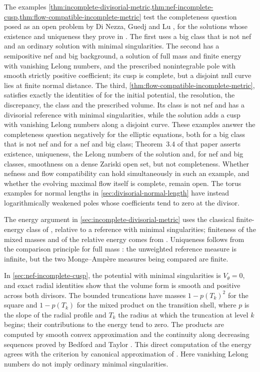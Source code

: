 The examples \cref{thm:incomplete-divisorial-metric,thm:nef-incomplete-cusp,thm:flow-compatible-incomplete-metric} test the completeness question posed as an open problem by Di Nezza, Guedj and Lu \cite[v1, Question~3.5, p.~14]{DNGL26}, for the solutions whose existence and uniqueness they prove in \cite[v1, Theorem~3.4, p.~14]{DNGL26}. The first uses a big class that is not nef and an ordinary solution with minimal singularities. The second has a semipositive nef and big background, a solution of full mass and finite energy with vanishing Lelong numbers, and the prescribed nonintegrable pole with smooth strictly positive coefficient; its cusp is complete, but a disjoint null curve lies at finite normal distance. The third, \cref{thm:flow-compatible-incomplete-metric}, satisfies exactly the identities of \cite[v1, Section~3.1, pp.~12--14]{DNGL26} for the initial potential, the resolution, the discrepancy, the class and the prescribed volume. Its class is not nef and has a divisorial reference with minimal singularities, while the solution adds a cusp with vanishing Lelong numbers along a disjoint curve. These examples answer the completeness question negatively for the elliptic equations, both for a big class that is not nef and for a nef and big class; Theorem~3.4 of that paper asserts existence, uniqueness, the Lelong numbers of the solution and, for nef and big classes, smoothness on a dense Zariski open set, but not completeness. Whether nefness and flow compatibility can hold simultaneously in such an example, and whether the evolving maximal flow itself is complete, remain open. The torus examples for normal lengths in \cref{sec:divisorial-normal-length} have instead logarithmically weakened poles whose coefficients tend to zero at the divisor.

The energy argument in \cref{sec:incomplete-divisorial-metric} uses the classical finite-energy class of \cite[Section~2, pp.~223--236]{BEGZ10}, relative to a reference with minimal singularities; finiteness of the mixed masses and of the relative energy comes from \cite[Proposition~1.6, p.~206, and Section~2.2, pp.~226--230]{BEGZ10}. Uniqueness follows from the comparison principle for full mass \cite[Corollary~2.3, p.~224]{BEGZ10}: the unweighted reference measure is infinite, but the two Monge--Amp\`ere measures being compared are finite.

In \cref{sec:nef-incomplete-cusp}, the potential with minimal singularities is $V_\theta=0$, and exact radial identities show that the volume form is smooth and positive across both divisors. The bounded truncations have masses $1-p(T_k)^2$ for the square and $1-p(T_k)$ for the mixed product on the transition shell, where $p$ is the slope of the radial profile and $T_k$ the radius at which the truncation at level $k$ begins; their contributions to the energy tend to zero. The products are computed by smooth convex approximation and the continuity along decreasing sequences proved by Bedford and Taylor \cite[Theorem~2.1, pp.~4--7]{BT82}. This direct computation of the energy agrees with the criterion by canonical approximation of \cite[Propositions~2.10--2.11, pp.~228--230]{BEGZ10}. Here vanishing Lelong numbers do not imply ordinary minimal singularities.

